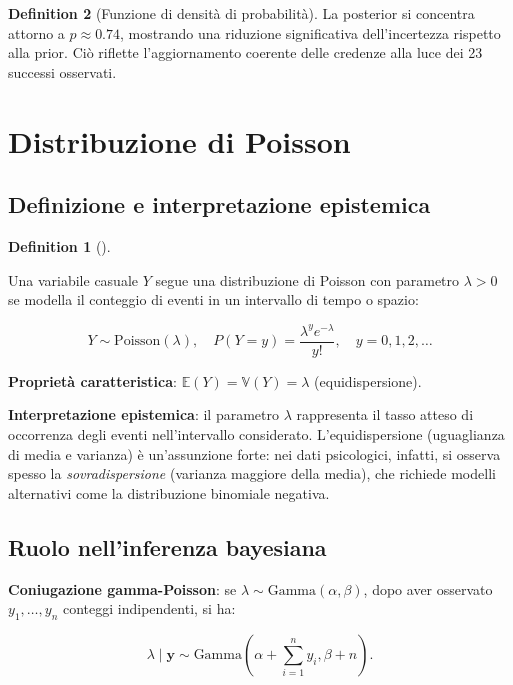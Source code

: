 \documentclass[
  letterpaper,
  DIV=11,
  numbers=noendperiod,
  oneside]{scrreprt}
\theoremstyle{definition}
\theoremstyle{plain}
\theoremstyle{definition}
\newtheorem{definition}{Definition}[chapter]
\theoremstyle{remark}
\begin{document}
\begin{definition}[Funzione di densità di
probabilità]
La posterior si concentra attorno a \(p \approx 0.74\), mostrando una
riduzione significativa dell'incertezza rispetto alla prior. Ciò
riflette l'aggiornamento coerente delle credenze alla luce dei 23
successi osservati.

\section{Distribuzione di Poisson}\label{distribuzione-di-poisson}

\subsection{Definizione e interpretazione
epistemica}\label{definizione-e-interpretazione-epistemica-4}

\begin{definition}[]\protect\hypertarget{def-poisson}{}\label{def-poisson}

Una variabile casuale \(Y\) segue una distribuzione di Poisson con
parametro \(\lambda > 0\) se modella il conteggio di eventi in un
intervallo di tempo o spazio:

\[
Y \sim \text{Poisson}(\lambda), \quad P(Y = y) = \frac{\lambda^y e^{-\lambda}}{y!}, \quad y = 0, 1, 2, \ldots
\]

\textbf{Proprietà caratteristica}:
\(\mathbb{E}(Y) = \mathbb{V}(Y) = \lambda\) (equidispersione).

\end{definition}

\textbf{Interpretazione epistemica}: il parametro \(\lambda\)
rappresenta il tasso atteso di occorrenza degli eventi nell'intervallo
considerato. L'equidispersione (uguaglianza di media e varianza) è
un'assunzione forte: nei dati psicologici, infatti, si osserva spesso la
\emph{sovradispersione} (varianza maggiore della media), che richiede
modelli alternativi come la distribuzione binomiale negativa.

\subsection{Ruolo nell'inferenza
bayesiana}\label{ruolo-nellinferenza-bayesiana-3}

\textbf{Coniugazione gamma-Poisson}: se
\(\lambda \sim \text{Gamma}(\alpha, \beta)\), dopo aver osservato
\(y_1, \ldots, y_n\) conteggi indipendenti, si ha:

\[
\lambda \mid \mathbf{y} \sim \text{Gamma}\left(\alpha + \sum_{i=1}^n y_i, \beta + n\right).
\]


\end{definition}
\end{document}
